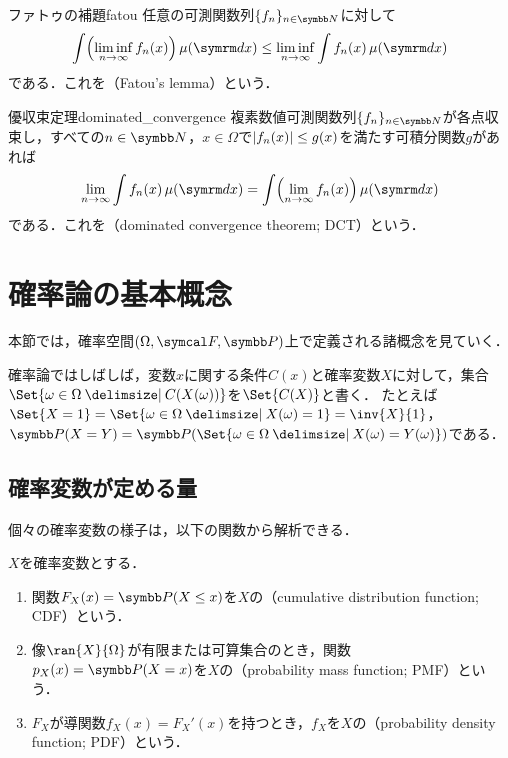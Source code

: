 \documentclass[../../main]{subfiles}
\begin{document}
\begin{theorem}{ファトゥの補題}{fatou}
  任意の可測関数列\(\seq{f_n}_{n\in\numset{N}}\)に対して
  \[
    \int\pqty*{\liminf_{n\to\infty}f_n(x)}\measured[x]{\mu} \leq \liminf_{n\to\infty}\int f_n(x)\measured[x]{\mu}
  \]
  である．これを（Fatou's lemma）という．
\end{theorem}

\begin{theorem}{優収束定理}{dominated_convergence}
  複素数値可測関数列\(\seq{f_n}_{n\in\numset{N}}\)が各点収束し，すべての\(n\in\numset{N}\)，\(x\in\Omega\)で\(\lvert f_n(x)\rvert\leq g(x)\)を満たす可積分関数\(g\)があれば
  \[
    \lim_{n\to\infty}\int f_n(x)\measured[x]{\mu} = \int\pqty*{\lim_{n\to\infty}f_n(x)}\measured[x]{\mu}
  \]
  である．これを（dominated convergence theorem; DCT）という．
\end{theorem}

\section{確率論の基本概念}

本節では，確率空間\((\Omega,\sigmaalg{F},\prob)\)上で定義される諸概念を見ていく．

確率論ではしばしば，変数\(x\)に関する条件\(C(x)\)と確率変数\(X\)に対して，集合\(\Set{\omega\in\Omega\given C(X(\omega))}\)を\(\Set{C(X)}\)と書く．
たとえば\(\Set{X=1}=\Set{\omega\in\Omega\given X(\omega)=1}=\inv{X}{1}\)，\(\prob(X=Y)=\prob(\Set{\omega\in\Omega\given X(\omega)=Y(\omega)})\)である．

\subsection{確率変数が定める量}

個々の確率変数の様子は，以下の関数から解析できる．

\begin{definition}{}{}
  \(X\)を確率変数とする．
  \begin{enumerate}
    \item 関数\(F_X(x)=\prob(X\leq x)\)を\(X\)の（cumulative distribution function; CDF）という．
    \item 像\(\ran{X}{\Omega}\)が有限または可算集合のとき，関数\(p_X(x)=\prob(X=x)\)を\(X\)の（probability mass function; PMF）という．
    \item \(F_X\)が導関数\(f_X(x)=F_X'(x)\)を持つとき，\(f_X\)を\(X\)の（probability density function; PDF）という\footnotemark．
  \end{enumerate}
\end{definition}
\end{document}
